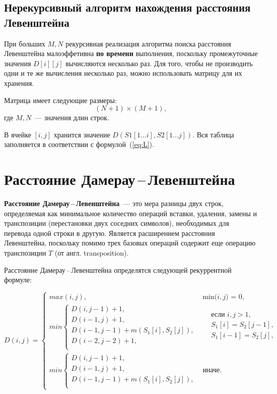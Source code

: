 \subsection{Нерекурсивный алгоритм нахождения расстояния Левенштейна}

При больших $M, N$ рекурсивная реализация алгоритма поиска расстояния Левенштейна малоэффетивна \textbf{по времени} выполнения, поскольку промежуточные значения $D[i][j]$ вычисляются несколько раз. Для того, чтобы не производить одни и те же вычисления несколько раз, можно использовать матрицу для их хранения.

Матрица имеет следующие размеры:
\begin{equation}
	\label{eq:lev-m-size}
	(N + 1) \times (M + 1),
\end{equation}
где $M, N$~--- значения длин строк.

В ячейке $[i, j]$ хранится значение $D(S1[1...i], S2[1...j])$. Вся таблица заполняется в соответствии с формулой~(\ref{eq:L}). 

\section{Расстояние Дамерау\,--\,Левенштейна}
\textbf{Расстояние Дамерау\,--\,Левенштейна}~--- это мера разницы двух строк, определяемая как минимальное количество операций вставки, удаления, замены и транспозиции (перестановки двух соседних символов), необходимых для перевода одной строки в другую. Является расширением расстояния Левенштейна, поскольку помимо трех базовых операций содержит еще операцию транспозиции $T$ (от англ. transposition).

Расстояние Дамерау\,--\,Левенштейна определятся следующей рекуррентной формуле:

\begin{equation}
	\label{eq:DL}
	D(i, j) = 
	\begin{cases}
            max(i, j), &\text{min($i, j$) = 0,}\\
		min \begin{cases}
			D(i, j - 1) + 1,\\
			D(i - 1, j) + 1,\\
			D(i - 1, j - 1) + m(S_{1}[i], S_{2}[j]), \\
			D(i - 2, j - 2) + 1, \\
		\end{cases}
		& \begin{aligned}
			& \text{если $i, j > 1$}, \\
			& S_{1}[i] = S_{2}[j - 1], \\
			& S_{1}[i - 1] = S_{2}[j], \\
		\end{aligned}\\
		min \begin{cases}
			D(i, j - 1) + 1,\\
			D(i - 1, j) + 1, \\
			D(i - 1, j - 1) + m(S_{1}[i], S_{2}[j]), \\
		\end{cases}
		 & \text{иначе.}
	\end{cases}
\end{equation}

